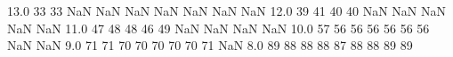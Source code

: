 13.0  33  33  NaN NaN NaN NaN NaN NaN NaN
12.0  39  41  40  40  NaN NaN NaN NaN NaN
11.0  47  48  48  46  49  NaN NaN NaN NaN
10.0  57  56  56  56  56  56  56  NaN NaN
9.0  71  71  70  70  70  70  70  71  NaN
8.0  89  88  88  88  87  88  88  89  89
